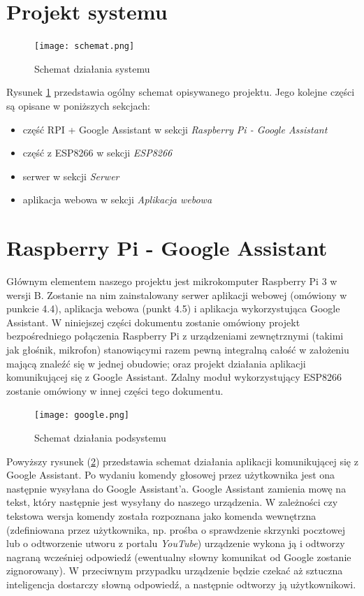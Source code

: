 \section{Projekt systemu}

	\begin{figure}[H]
	\centering
	\texttt{[image: schemat.png]}
	\caption{Schemat działania systemu}
	\label{img:system}
	\end{figure}
	
	
Rysunek \ref{img:system} przedstawia ogólny schemat opisywanego projektu.
Jego kolejne części są opisane w poniższych sekcjach:
\begin{itemize}
\item część RPI + Google Assistant w sekcji \textit{Raspberry Pi - Google Assistant}
\item część z ESP8266 w sekcji \textit{ESP8266}
\item serwer w sekcji \textit{Serwer}
\item aplikacja webowa w sekcji \textit{Aplikacja webowa}
\end{itemize}


\section{Raspberry Pi - Google Assistant}

Głównym elementem naszego projektu jest mikrokomputer Raspberry Pi 3 w wersji B. Zostanie na nim zainstalowany serwer aplikacji webowej (omówiony w punkcie 4.4), aplikacja webowa (punkt 4.5) i aplikacja wykorzystująca Google Assistant. W niniejszej części dokumentu zostanie omówiony projekt bezpośredniego połączenia Raspberry Pi z urządzeniami zewnętrznymi (takimi jak głośnik, mikrofon) stanowiącymi razem pewną integralną całość w założeniu mającą znaleźć się w jednej obudowie; oraz projekt działania aplikacji komunikującej się z Google Assistant. Zdalny moduł wykorzystujący ESP8266 zostanie omówiony w innej części tego dokumentu.
	
	\begin{figure}[H]
		\centering
	\texttt{[image: google.png]}
	\caption{Schemat działania podsystemu}
	\label{img:google}
	\end{figure}

Powyższy rysunek (\ref{img:google}) przedstawia schemat działania aplikacji komunikującej się z Google Assistant. Po wydaniu komendy głosowej przez użytkownika jest ona następnie wysyłana do Google Assistant'a. Google Assistant zamienia mowę na tekst, który następnie jest wysyłany do naszego urządzenia. W zależności czy tekstowa wersja komendy została rozpoznana jako komenda wewnętrzna (zdefiniowana przez użytkownika, np. prośba o sprawdzenie skrzynki pocztowej lub o odtworzenie utworu z portalu \emph{YouTube}) urządzenie wykona ją i odtworzy nagraną wcześniej odpowiedź (ewentualny słowny komunikat od Google zostanie zignorowany). W przeciwnym przypadku urządzenie będzie czekać aż sztuczna inteligencja dostarczy słowną odpowiedź, a następnie odtworzy ją użytkownikowi.

